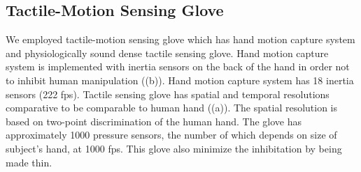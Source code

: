 \documentclass[letterpaper, 10 pt, conference]{IEEEtran}  %
\begin{document}




\subsection{Tactile-Motion Sensing Glove}
We employed tactile-motion sensing glove which has hand motion capture system and physiologically sound dense tactile sensing glove\cite{SagisakaONOK12}. Hand motion capture system is implemented with inertia sensors on the back of the hand in order not to inhibit human manipulation ((b)). Hand motion capture system has 18 inertia sensors (222 fps). Tactile sensing glove has spatial and temporal resolutions comparative to be comparable to human hand ((a)). The spatial resolution is based on two-point discrimination of the human hand\cite{weinstein1968intensive}. The glove has approximately 1000 pressure sensors, the number of which depends on size of subject's hand, at 1000 fps. This glove also minimize the inhibitation by being made thin.
\end{document}
